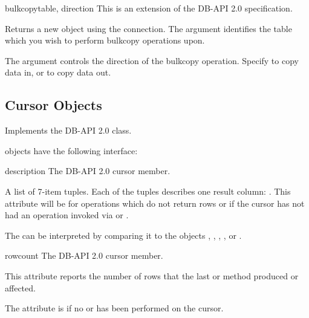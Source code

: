 \begin{methoddesc}[Connection]{bulkcopy}{table, direction}
This is an extension of the DB-API 2.0 specification.

Returns a new  object using the connection.  The
 argument identifies the table which you wish to perform
bulkcopy operations upon.

The  argument controls the direction of the bulkcopy
operation.  Specify  to copy data in, or
 to copy data out.
\end{methoddesc}

\subsection{Cursor Objects}

Implements the DB-API 2.0  class.

 objects have the following interface:

\begin{memberdesc}[Cursor]{description}
The DB-API 2.0 cursor  member.

A list of 7-item tuples.  Each of the tuples describes one result
column: .  This attribute will be  for
operations which do not return rows or if the cursor has not had an
operation invoked via  or .

The  can be interpreted by comparing it to the
 objects , ,
, , or .
\end{memberdesc}

\begin{memberdesc}[Cursor]{rowcount}
The DB-API 2.0 cursor  member.

This attribute reports the number of rows that the last
 or  method produced or
affected.

The attribute is  if no  or
 has been performed on the cursor.
\end{memberdesc}

